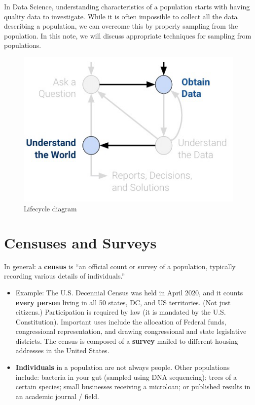 \documentclass[
  letterpaper,
  DIV=11,
  numbers=noendperiod]{scrreprt}
\providecommand{\tightlist}{%
  \setlength{\itemsep}{0pt}\setlength{\parskip}{0pt}}\usepackage{longtable,booktabs,array}
\begin{document}
In Data Science, understanding characteristics of a population starts
with having quality data to investigate. While it is often impossible to
collect all the data describing a population, we can overcome this by
properly sampling from the population. In this note, we will discuss
appropriate techniques for sampling from populations.

\begin{figure}

{\centering \includegraphics{sampling/images/data_life_cycle_sampling.png}

}

\caption{Lifecycle diagram}

\end{figure}

\hypertarget{censuses-and-surveys}{%
\section{Censuses and Surveys}\label{censuses-and-surveys}}

In general: a \textbf{census} is ``an official count or survey of a
population, typically recording various details of individuals.''

\begin{itemize}
\tightlist
\item
  Example: The U.S. Decennial Census was held in April 2020, and it
  counts \textbf{every person} living in all 50 states, DC, and US
  territories. (Not just citizens.) Participation is required by law (it
  is mandated by the U.S. Constitution). Important uses include the
  allocation of Federal funds, congressional representation, and drawing
  congressional and state legislative districts. The census is composed
  of a \textbf{survey} mailed to different housing addresses in the
  United States.
\item
  \textbf{Individuals} in a population are not always people. Other
  populations include: bacteria in your gut (sampled using DNA
  sequencing); trees of a certain species; small businesses receiving a
  microloan; or published results in an academic journal / field.
\end{itemize}
\end{document}
